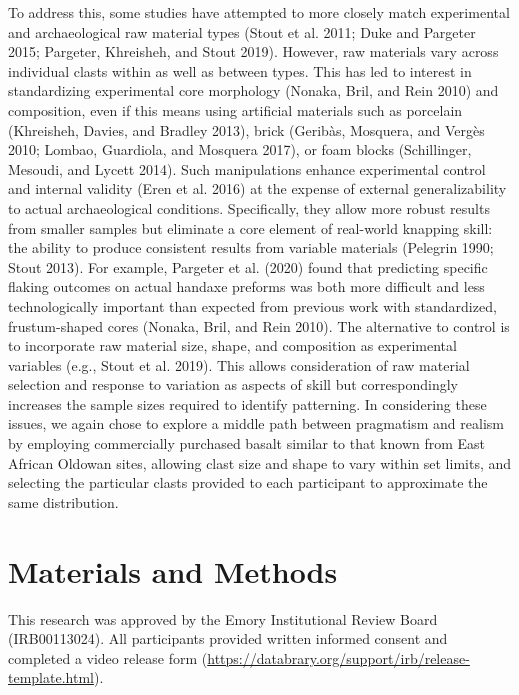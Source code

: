 \documentclass[smallextended]{svjour3}       %
\begin{document}
To address this, some studies have attempted to more closely match
experimental and archaeological raw material types (Stout et al. 2011;
Duke and Pargeter 2015; Pargeter, Khreisheh, and Stout 2019). However,
raw materials vary across individual clasts within as well as between
types. This has led to interest in standardizing experimental core
morphology (Nonaka, Bril, and Rein 2010) and composition, even if this
means using artificial materials such as porcelain (Khreisheh, Davies,
and Bradley 2013), brick (Geribàs, Mosquera, and Vergès 2010; Lombao,
Guardiola, and Mosquera 2017), or foam blocks (Schillinger, Mesoudi, and
Lycett 2014). Such manipulations enhance experimental control and
internal validity (Eren et al. 2016) at the expense of external
generalizability to actual archaeological conditions. Specifically, they
allow more robust results from smaller samples but eliminate a core
element of real-world knapping skill: the ability to produce consistent
results from variable materials (Pelegrin 1990; Stout 2013). For
example, Pargeter et al. (2020) found that predicting specific flaking
outcomes on actual handaxe preforms was both more difficult and less
technologically important than expected from previous work with
standardized, frustum-shaped cores (Nonaka, Bril, and Rein 2010). The
alternative to control is to incorporate raw material size, shape, and
composition as experimental variables (e.g., Stout et al. 2019). This
allows consideration of raw material selection and response to variation
as aspects of skill but correspondingly increases the sample sizes
required to identify patterning. In considering these issues, we again
chose to explore a middle path between pragmatism and realism by
employing commercially purchased basalt similar to that known from East
African Oldowan sites, allowing clast size and shape to vary within set
limits, and selecting the particular clasts provided to each participant
to approximate the same distribution.

\hfill\break

\hypertarget{materials-and-methods}{%
\section{\texorpdfstring{\textbf{Materials and
Methods}}{Materials and Methods}}\label{materials-and-methods}}

This research was approved by the Emory Institutional Review Board
(IRB00113024). All participants provided written informed consent and
completed a video release form
(\url{https://databrary.org/support/irb/release-template.html}).
\end{document}
